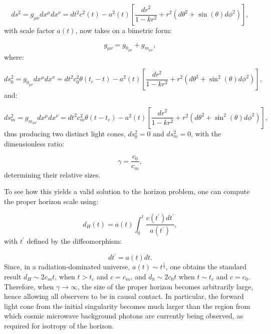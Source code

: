 \documentclass{article}
\begin{document}
\begin{equation}
d s^2 = g_{\mu \nu} d x^{\mu} d x^{\nu} = d t^2 c^2 \left( t \right) - a^2 \left( t \right) \left[ \frac{d r^2}{1 - k r^2} + r^2 \left( d \theta^2 + \sin \left( \theta \right) d \phi^2 \right) \right],
\end{equation}
with scale factor ${a \left( t \right)}$, now takes on a bimetric form:

\begin{equation}
g_{\mu \nu} = g_{{0}_{\mu \nu}} + g_{{m}_{\mu \nu}},
\end{equation}
where:

\begin{equation}
d s_{0}^{2} = g_{{0}_{\mu \nu}} d x^{\mu} d x^{\nu} = d t^2 c_{0}^{2} \theta \left( t_c - t \right) - a^2 \left( t \right) \left[ \frac{d r^2}{1 - k r^2} + r^2 \left( d \theta^2 + \sin^2 \left( \theta \right) d \phi^2 \right) \right],
\end{equation}
and:

\begin{equation}
d s_{m}^{2} = g_{{m}_{\mu \nu}} d x^{\mu} d x^{\nu} = d t^2 c_{m}^{2} \theta \left( t - t_c \right) - a^2 \left( t \right) \left[ \frac{d r^2}{1 - k r^2} + r^2 \left( d \theta^2 + \sin^2 \left( \theta \right) d \phi^2 \right) \right],
\end{equation}
thus producing two distinct light cones, ${d s_{0}^{2} = 0}$ and ${d s_{m}^{2} = 0}$, with the dimensionless ratio:

\begin{equation}
\gamma = \frac{c_0}{c_m},
\end{equation}
determining their relative sizes.

To see how this yields a valid solution to the horizon problem, one can compute the proper horizon scale using:

\begin{equation}
d_H \left( t \right) = a \left( t \right) \int_{0}^{t} \frac{c \left( t^{\prime} \right) d t^{\prime}}{a \left( t^{\prime} \right)},
\end{equation}
with ${t^{\prime}}$ defined by the diffeomorphism:

\begin{equation}
d t^{\prime} = a \left( t \right) d t.
\end{equation}
Since, in a radiation-dominated universe, ${a \left( t \right) \sim t^{\frac{1}{2}}}$, one obtains the standard result ${d_H \sim 2 c_m t}$, when ${t > t_c}$ and ${c = c_m}$, and ${d_h \sim 2 c_0 t}$ when ${t \sim t_c}$ and ${c = c_0}$. Therefore, when ${\gamma \to \infty}$, the size of the proper horizon becomes arbitrarily large, hence allowing all observers to be in causal contact. In particular, the forward light cone from the initial singularity becomes much larger than the region from which cosmic microwave background photons are currently being observed, as required for isotropy of the horizon.
\end{document}
